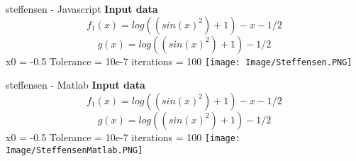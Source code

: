 \documentclass{article}
\begin{document}
\begin{section}{steffensen - Javascript}
   \textbf{Input data}\newline
   \[f_{1}(x) = log((sin(x)^2)+1)-x-1/2\]\newline
    \[g(x) = log((sin(x)^2)+1)-1/2\]\newline
    x0 = -0.5\newline
    Tolerance = 10e-7\newline
    iterations = 100 \newline\newline
    \texttt{[image: Image/Steffensen.PNG]}
\end{section}
\begin{section}{steffensen - Matlab}
   \textbf{Input data}\newline
    \[f_{1}(x) = log((sin(x)^2)+1)-x-1/2\]\newline
    \[g(x) = log((sin(x)^2)+1)-1/2\]\newline
    x0 = -0.5\newline
    Tolerance = 10e-7\newline
    iterations = 100 \newline\newline
    \texttt{[image: Image/SteffensenMatlab.PNG]}
\end{section}
\end{document}
